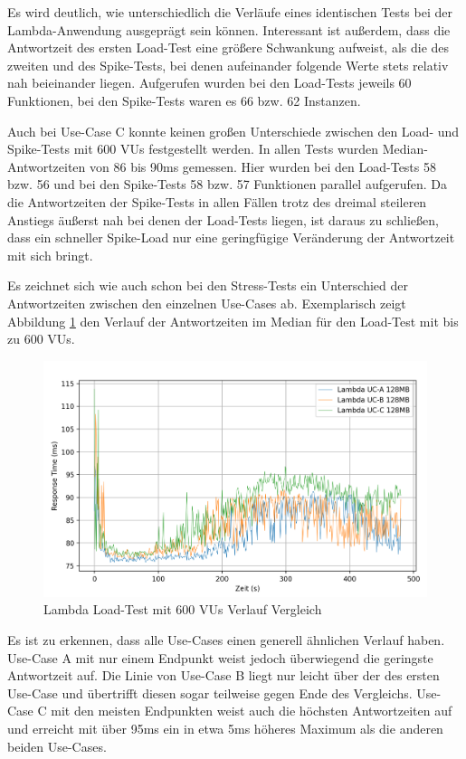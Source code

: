 Es wird deutlich, wie unterschiedlich die Verläufe eines identischen Tests bei der Lambda-Anwendung ausgeprägt sein können. Interessant ist außerdem, dass die Antwortzeit des ersten Load-Test eine größere Schwankung aufweist, als die des zweiten und des Spike-Tests, bei denen aufeinander folgende Werte stets relativ nah beieinander liegen. Aufgerufen wurden bei den Load-Tests jeweils 60 Funktionen, bei den Spike-Tests waren es 66 bzw. 62 Instanzen.

Auch bei Use-Case C konnte keinen großen Unterschiede zwischen den Load- und Spike-Tests mit 600 \acp{VU} festgestellt werden. In allen Tests wurden Median-Antwortzeiten von 86 bis 90ms gemessen. Hier wurden bei den Load-Tests 58 bzw. 56 und bei den Spike-Tests 58 bzw. 57 Funktionen parallel aufgerufen.
Da die Antwortzeiten der Spike-Tests in allen Fällen trotz des dreimal steileren Anstiegs äußerst nah bei denen der Load-Tests liegen, ist daraus zu schließen, dass ein schneller Spike-Load nur eine geringfügige Veränderung der Antwortzeit mit sich bringt. 

Es zeichnet sich wie auch schon bei den Stress-Tests ein Unterschied der Antwortzeiten zwischen den einzelnen Use-Cases ab. Exemplarisch zeigt Abbildung \ref{fig:lambda128-load600-uc-comparison} den Verlauf der Antwortzeiten im Median für den Load-Test mit bis zu 600 \acp{VU}.

\begin{figure}[H]
    \includegraphics[width=\textwidth]{img/lambda128-load600-uc-comparison-new.png}
    \caption[Lambda Load-Test mit 600 VUs Verlauf Vergleich]{Lambda Load-Test mit 600 VUs Verlauf Vergleich}
    \label{fig:lambda128-load600-uc-comparison}
\end{figure}

Es ist zu erkennen, dass alle Use-Cases einen generell ähnlichen Verlauf haben. Use-Case A mit nur einem Endpunkt weist jedoch überwiegend die geringste Antwortzeit auf. Die Linie von Use-Case B liegt nur leicht über der des ersten Use-Case und übertrifft diesen sogar teilweise gegen Ende des Vergleichs. Use-Case C mit den meisten Endpunkten weist auch die höchsten Antwortzeiten auf und erreicht mit über 95ms ein in etwa 5ms höheres Maximum als die anderen beiden Use-Cases.  


